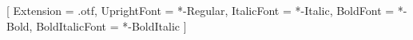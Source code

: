 \newfontfamily{}[
  Extension = {.otf}, %
  UprightFont    = *-Regular,
  ItalicFont     = *-Italic,
  BoldFont       = *-Bold,
  BoldItalicFont = *-BoldItalic
]



